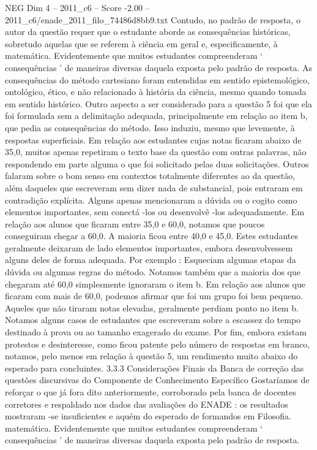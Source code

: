 \begin{textsample}{NEG Dim 4 – 2011\_c6 – Score -2.00 – 2011\_c6/enade\_2011\_filo\_74486d8bb9.txt}
Contudo, no padrão de resposta, o autor da questão requer que o estudante aborde as consequências históricas, sobretudo aquelas que se referem à ciência em geral e, especificamente, à matemática.
Evidentemente que muitos estudantes compreenderam ‘ consequências ’ de maneiras diversas daquela exposta pelo padrão de resposta.
As consequências do método cartesiano foram entendidas em sentido epistemológico, ontológico, ético, e não relacionado à história da ciência, mesmo quando tomada em sentido histórico.
Outro aspecto a ser considerado para a questão 5 foi que ela foi formulada sem a delimitação adequada, principalmente em relação ao item b, que pedia as consequências do método.
Isso induziu, mesmo que levemente, à respostas superficiais.
Em relação aos estudantes cujas notas ficaram abaixo de 35,0, muitos apenas repetiram o texto base da questão com outras palavras, não respondendo em parte alguma o que foi solicitado pelas duas solicitações.
Outros falaram sobre o bom senso em contextos totalmente diferentes ao da questão, além daqueles que escreveram sem dizer nada de substancial, pois entraram em contradição explícita.
Alguns apenas mencionaram a dúvida ou o cogito como elementos importantes, sem conectá -los ou desenvolvê -los adequadamente.
Em relação aos alunos que ficaram entre 35,0 e 60,0, notamos que poucos conseguiram chegar a 60,0.
A maioria ficou entre 40,0 e 45,0.
Estes estudantes geralmente deixaram de lado elementos importantes, embora desenvolvessem alguns deles de forma adequada.
Por exemplo : Esqueciam algumas etapas da dúvida ou algumas regras do método.
Notamos também que a maioria dos que chegaram até 60,0 simplesmente ignoraram o item b.
Em relação aos alunos que ficaram com mais de 60,0, podemos afirmar que foi um grupo foi bem pequeno.
Aqueles que não tiraram notas elevadas, geralmente perdiam ponto no item b.
Notamos alguns casos de estudantes que escreveram sobre a escassez do tempo destinado à prova ou ao tamanho exagerado do exame.
Por fim, embora existam protestos e desinteresse, como ficou patente pelo número de respostas em branco, notamos, pelo menos em relação à questão 5, um rendimento muito abaixo do esperado para concluintes. 3.3.3 Considerações Finais da Banca de correção das questões discursivas do Componente de Conhecimento Específico Gostaríamos de reforçar o que já fora dito anteriormente, corroborado pela banca de docentes corretores e respaldado nos dados das avaliações do ENADE : os resultados mostraram -se insuficientes e aquém do esperado de formandos em Filosofia. matemática.
Evidentemente que muitos estudantes compreenderam ‘ consequências ’ de maneiras diversas daquela exposta pelo padrão de resposta.

\end{textsample}
